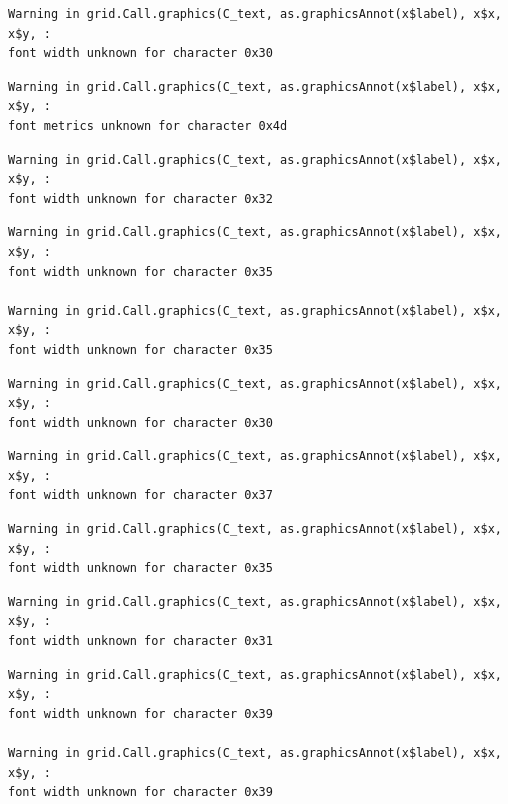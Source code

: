 \documentclass[
  letterpaper,
  DIV=11,
  numbers=noendperiod]{scrreprt}
\begin{document}
\begin{verbatim}
Warning in grid.Call.graphics(C_text, as.graphicsAnnot(x$label), x$x, x$y, :
font width unknown for character 0x30
\end{verbatim}

\begin{verbatim}
Warning in grid.Call.graphics(C_text, as.graphicsAnnot(x$label), x$x, x$y, :
font metrics unknown for character 0x4d
\end{verbatim}

\begin{verbatim}
Warning in grid.Call.graphics(C_text, as.graphicsAnnot(x$label), x$x, x$y, :
font width unknown for character 0x32
\end{verbatim}

\begin{verbatim}
Warning in grid.Call.graphics(C_text, as.graphicsAnnot(x$label), x$x, x$y, :
font width unknown for character 0x35

Warning in grid.Call.graphics(C_text, as.graphicsAnnot(x$label), x$x, x$y, :
font width unknown for character 0x35
\end{verbatim}

\begin{verbatim}
Warning in grid.Call.graphics(C_text, as.graphicsAnnot(x$label), x$x, x$y, :
font width unknown for character 0x30
\end{verbatim}

\begin{verbatim}
Warning in grid.Call.graphics(C_text, as.graphicsAnnot(x$label), x$x, x$y, :
font width unknown for character 0x37
\end{verbatim}

\begin{verbatim}
Warning in grid.Call.graphics(C_text, as.graphicsAnnot(x$label), x$x, x$y, :
font width unknown for character 0x35
\end{verbatim}

\begin{verbatim}
Warning in grid.Call.graphics(C_text, as.graphicsAnnot(x$label), x$x, x$y, :
font width unknown for character 0x31
\end{verbatim}

\begin{verbatim}
Warning in grid.Call.graphics(C_text, as.graphicsAnnot(x$label), x$x, x$y, :
font width unknown for character 0x39

Warning in grid.Call.graphics(C_text, as.graphicsAnnot(x$label), x$x, x$y, :
font width unknown for character 0x39
\end{verbatim}
\end{document}
